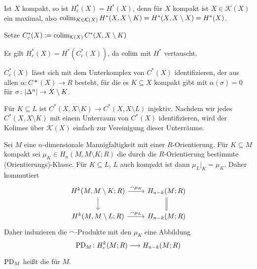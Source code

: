 \begin{beispiel}
	Ist $X$ kompakt, so ist $H^*_c(X)= H^*(X)$, denn für $X$ kompakt ist $X \in \mathcal{K}(X)$ ein maximal, also $\operatorname*{colim}_{K \in \mathcal{K}(X)} H^*(X,X \setminus K) = H^*(X,X\setminus X) = H^*(X)$.
\end{beispiel}

\begin{definition}
	Setze $C_c^*(X) := \operatorname*{colim}_{\mathcal{K}(X)} C^*(X,X\setminus K)$
\end{definition}

\begin{korollarB}
	Es gilt $H^*_c(X) = H^*( C^*_c(X))$, da $\operatorname*{colim}$ mit $H^*$ vertauscht.
\end{korollarB}

\begin{lemma}
	$C^*_c(X)$ lässt sich mit dem Unterkomplex von $C^*(X)$ identifizieren, der aus allen $\alpha \colon C*(X) \to R$ besteht, für die es $K \subseteq X$ kompakt gibt mit $\alpha(\sigma)=0$ für $\sigma \colon \abs*{\Delta^n} \to X\setminus K$.
\end{lemma}
\begin{beweis}
	Für $K \subseteq L$ ist $C^*(X,X\setminus K)\to C^*(X,X\setminus L)$ injektiv.
	Nachdem wir jedes $C^*(X,X\setminus K)$ mit einem Unterraum von $C^*(X)$ identifizieren, wird der Kolimes über $\mathcal{K}(X)$ einfach zur Vereinigung dieser Unterräume.
\end{beweis}

\begin{bemerkung}
	Sei $M $ eine $n$-dimensionale Mannigfaltigkeit mit einer $R$-Orientierung. Für $K \subseteq M$ kompakt sei $\mu_K \in H_n(M,M \setminus K;R)$ die durch die $R$-Orientierung bestimmte (Orientierungs)-Klasse.
	Für $K \subseteq L$, $L$ auch kompakt ist dann $\mu_L|_K = \mu_K$.
	Daher kommutiert
	\[
		\begin{tikzcd}
			H^k(M,M \setminus K;R)\dar \rar["\capp\mu_K"] &  H_{n-k}(M;R) \dar[equal] \\
			H^k(M,M \setminus L;R) \rar["\capp\mu_L"] & H_{n-k}(M;R)
		\end{tikzcd}
	\]
	Daher induzieren die $\smallfrown$-Produkte mit den $\mu_K$ eine Abbildung 
	\[
		\operatorname{PD}_M \colon H^k_c(M;R) \longrightarrow H_{n-k}(M;R)
	\]
\end{bemerkung}

\begin{definition}
	$\operatorname{PD}_M$ heißt die  für $M$. 
\end{definition}

